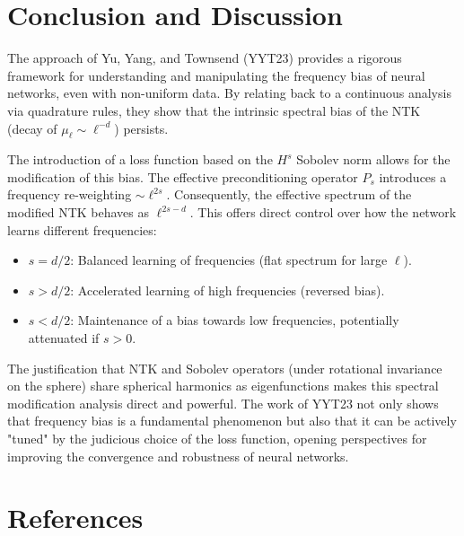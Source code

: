\documentclass{article}
\begin{document}
\section{Conclusion and Discussion}
The approach of Yu, Yang, and Townsend (YYT23) provides a rigorous framework for understanding and manipulating the frequency bias of neural networks, even with non-uniform data. By relating back to a continuous analysis via quadrature rules, they show that the intrinsic spectral bias of the NTK (decay of $\mu_\ell \sim \ell^{-d}$) persists.

The introduction of a loss function based on the $H^s$ Sobolev norm allows for the modification of this bias. The effective preconditioning operator $P_s$ introduces a frequency re-weighting $\sim \ell^{2s}$. Consequently, the effective spectrum of the modified NTK behaves as $\ell^{2s-d}$. This offers direct control over how the network learns different frequencies:
\begin{itemize}
    \item $s = d/2$: Balanced learning of frequencies (flat spectrum for large $\ell$).
    \item $s > d/2$: Accelerated learning of high frequencies (reversed bias).
    \item $s < d/2$: Maintenance of a bias towards low frequencies, potentially attenuated if $s>0$.
\end{itemize}
The justification that NTK and Sobolev operators (under rotational invariance on the sphere) share spherical harmonics as eigenfunctions makes this spectral modification analysis direct and powerful. The work of YYT23 not only shows that frequency bias is a fundamental phenomenon but also that it can be actively "tuned" by the judicious choice of the loss function, opening perspectives for improving the convergence and robustness of neural networks.

\section*{References}
\end{document}

